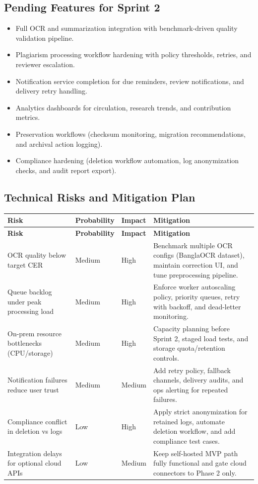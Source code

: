 \documentclass[12pt,a4paper]{article}
\begin{document}
\subsection*{Pending Features for Sprint 2}
\begin{itemize}
    \item Full OCR and summarization integration with benchmark-driven quality validation pipeline.
    \item Plagiarism processing workflow hardening with policy thresholds, retries, and reviewer escalation.
    \item Notification service completion for due reminders, review notifications, and delivery retry handling.
    \item Analytics dashboards for circulation, research trends, and contribution metrics.
    \item Preservation workflows (checksum monitoring, migration recommendations, and archival action logging).
    \item Compliance hardening (deletion workflow automation, log anonymization checks, and audit report export).
\end{itemize}
\newpage
\subsection*{Technical Risks and Mitigation Plan}
\renewcommand{\arraystretch}{1.16}
\small
\begin{longtable}{>{\raggedright\arraybackslash}p{3.2cm} >{\raggedright\arraybackslash}p{2.0cm} >{\raggedright\arraybackslash}p{1.8cm} >{\raggedright\arraybackslash}p{6.8cm}}
    \toprule
    \textbf{Risk} & \textbf{Probability} & \textbf{Impact} & \textbf{Mitigation} \\
    \midrule
    \endfirsthead
    \toprule
    \textbf{Risk} & \textbf{Probability} & \textbf{Impact} & \textbf{Mitigation} \\
    \midrule
    \endhead
    OCR quality below target CER & Medium & High & Benchmark multiple OCR configs (BanglaOCR dataset), maintain correction UI, and tune preprocessing pipeline. \\
    Queue backlog under peak processing load & Medium & High & Enforce worker autoscaling policy, priority queues, retry with backoff, and dead-letter monitoring. \\
    On-prem resource bottlenecks (CPU/storage) & Medium & High & Capacity planning before Sprint 2, staged load tests, and storage quota/retention controls. \\
    Notification failures reduce user trust & Medium & Medium & Add retry policy, fallback channels, delivery audits, and ops alerting for repeated failures. \\
    Compliance conflict in deletion vs logs & Low & High & Apply strict anonymization for retained logs, automate deletion workflow, and add compliance test cases. \\
    Integration delays for optional cloud APIs & Low & Medium & Keep self-hosted MVP path fully functional and gate cloud connectors to Phase 2 only. \\
    \bottomrule
\end{longtable}
\normalsize
\end{document}
